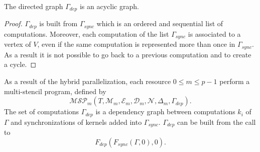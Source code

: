\begin{myprop}
The directed graph $\Gamma_{dep}$ is an acyclic graph.
\end{myprop}

\begin{proof}
$\Gamma_{dep}$ is built from $\Gamma_{sync}$ which is an ordered and sequential list of computations. Moreover, each computation of the list $\Gamma_{sync}$ is associated to a vertex of $V$, even if the same computation is represented more than once in $\Gamma_{sync}$. As a result it is not possible to go back to a previous computation and to create a cycle.
\end{proof}

As a result of the hybrid parallelization, each resource $0 \leq m \leq p-1$ perform a multi-stencil program, defined by
\begin{equation*}
\mathcal{MSP}_m(T,\mathcal{M}_m,\mathcal{E}_m,\mathcal{D}_m,\mathcal{N},\Delta_m,\Gamma_{dep}).
\end{equation*}
The set of computations $\Gamma_{dep}$ is a dependency graph between computations $k_i$ of $\Gamma$ and synchronizations of kernels added into $\Gamma_{sync}$. $\Gamma_{dep}$ can be built from the call to 
\begin{equation*}
F_{dep}(F_{sync}(\Gamma,0),0).
\end{equation*}

